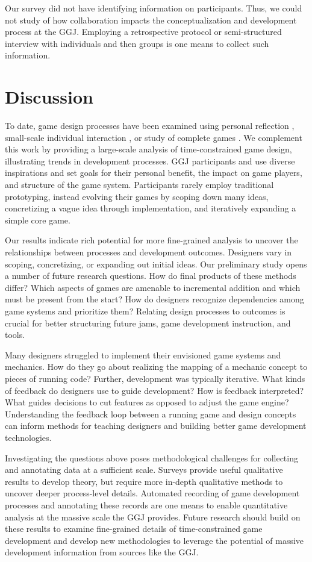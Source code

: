 \documentclass{sig-alternate}
\begin{document}
Our survey did not have identifying information on participants. Thus, we could not study of how collaboration impacts the conceptualization and development process at the GGJ. Employing a retrospective protocol or semi-structured interview with individuals and then groups is one means to collect such information.


\section{Discussion}
To date, game design processes have been examined using personal reflection \cite{anthropy2012:zinesters,hunicke2004:mda}, small-scale individual interaction \cite{nelson2009:reqanal}, or study of complete games \cite{bogost2011:howto}. We complement this work by providing a large-scale analysis of time-constrained game design, illustrating trends in development processes. 
GGJ participants and use diverse inspirations and set goals for their personal benefit, the impact on game players, and structure of the game system.
Participants rarely employ traditional prototyping, instead evolving their games by scoping down many ideas, concretizing a vague idea through implementation, and iteratively expanding a simple core game.

Our results indicate rich potential for more fine-grained analysis to uncover the relationships between processes and development outcomes. Designers vary in scoping, concretizing, or expanding out initial ideas. Our preliminary study opens a number of future research questions. How do final products of these methods differ? Which aspects of games are amenable to incremental addition and which must be present from the start? How do designers recognize dependencies among game systems and prioritize them? Relating design processes to outcomes is crucial for better structuring future jams, game development instruction, and tools.

Many designers struggled to implement their envisioned game systems and mechanics. How do they go about realizing the mapping of a mechanic concept to pieces of running code? Further, development was typically iterative. What kinds of feedback do designers use to guide development? How is feedback interpreted? What guides decisions to cut features as opposed to adjust the game engine? Understanding the feedback loop between a running game and design concepts can inform methods for teaching designers and building better game development technologies.

Investigating the questions above poses methodological challenges for collecting and annotating data at a sufficient scale. Surveys provide useful qualitative results to develop theory, but require more in-depth qualitative methods to uncover deeper process-level details. Automated recording of game development processes and annotating these records are one means to enable quantitative analysis at the massive scale the GGJ provides. 
Future research should build on these results to examine fine-grained details of time-constrained game development and develop new methodologies to leverage the potential of massive development information from sources like the GGJ.
\end{document}
